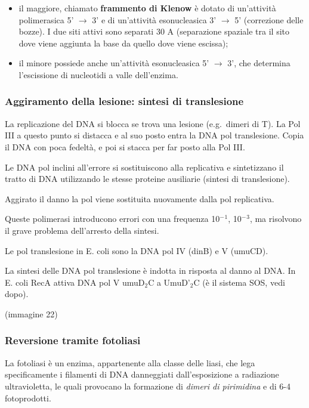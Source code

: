 \documentclass[]{article}
\begin{document}
\begin{itemize}
\itemsep1pt\parskip0pt
\item
  il maggiore, chiamato \textbf{frammento di Klenow} è dotato di
  un'attività polimerasica 5' $\rightarrow$ 3' e di un'attività
  esonucleasica 3' $\rightarrow$ 5' (correzione delle bozze). I due siti
  attivi sono separati 30 A (separazione spaziale tra il sito dove viene
  aggiunta la base da quello dove viene escissa);
\item
  il minore possiede anche un'attività esonucleasica 5' $\rightarrow$
  3', che determina l'escissione di nucleotidi a valle dell'enzima.
\end{itemize}

\subsubsection{Aggiramento della lesione: sintesi di
translesione}\label{aggiramento-della-lesione-sintesi-di-translesione}

La replicazione del DNA si blocca se trova una lesione (e.g.~dimeri di
T). La Pol III a questo punto si distacca e al suo posto entra la DNA
pol translesione. Copia il DNA con poca fedeltà, e poi si stacca per far
posto alla Pol III.

Le DNA pol inclini all'errore si sostituiscono alla replicativa e
sintetizzano il tratto di DNA utilizzando le stesse proteine ausiliarie
(sintesi di translesione).

Aggirato il danno la pol viene sostituita nuovamente dalla pol
replicativa.

Queste polimerasi introducono errori con una frequenza 10$^-$$^1$,
10$^-$$^3$, ma risolvono il grave problema dell'arresto della sintesi.

Le pol translesione in E. coli sono la DNA pol IV (dinB) e V (umuCD).

La sintesi delle DNA pol translesione è indotta in risposta al danno al
DNA. In E. coli RecA attiva DNA pol V umuD$_2$C a UmuD'$_2$C (è il
sistema SOS, vedi dopo).

(immagine 22)

\subsubsection{Reversione tramite
fotoliasi}\label{reversione-tramite-fotoliasi}

La fotoliasi è un enzima, appartenente alla classe delle liasi, che lega
specificamente i filamenti di DNA danneggiati dall'esposizione a
radiazione ultravioletta, le quali provocano la formazione di
\emph{dimeri di pirimidina} e di 6-4 fotoprodotti.
\end{document}
